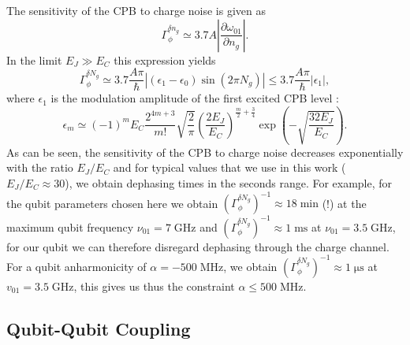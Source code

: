 The sensitivity of the CPB to charge noise is given as	
%
\begin{equation}
\Gamma_\phi^{\delta n_g} \simeq 3.7A \left|\frac{\partial \omega_{01}}{\partial n_g}\right|.
\end{equation}
%
In the limit $E_J\gg E_C$ this expression yields
%
\begin{equation}
\Gamma_\phi^{\delta N_g} \simeq 3.7\frac{A\pi}{\hbar}\left| (\epsilon_1-\epsilon_0)\sin{\left(2\pi N_g\right)}\right| \leq 3.7\frac{A\pi}{\hbar}|\epsilon_1|,
\end{equation}
%
where $\epsilon_1$ is the modulation amplitude of the first excited CPB level \citep{koch_charge-insensitive_2007}:
%
\begin{equation}
\epsilon_m\simeq (-1)^m E_C\frac{2^{4m+3}}{m!}\sqrt{\frac{2}{\pi}}\left(\frac{2E_J}{E_C}\right)^{\frac{m}{2}+\frac{3}{4}}\exp{\left(-\sqrt{\frac{32E_J}{E_C}}\right)}.
\end{equation}
%
As can be seen, the sensitivity of the CPB to charge noise decreases exponentially with the ratio $E_J/E_C$ and for typical values that we use in this work ($E_J/E_C\approx 30$), we obtain dephasing times in the seconds range. For example, for the qubit parameters chosen here we obtain $\left(\Gamma_{\phi}^{\delta N_g}\right)^{-1} \approx 18\;\mathrm{min}$ (!) at the maximum qubit frequency $\nu_{01}=7\;\mathrm{GHz}$ and  $\left(\Gamma_{\phi}^{\delta N_g}\right)^{-1} \approx 1\;\mathrm{ms}$ at $\nu_{01}=3.5\;\mathrm{GHz}$, for our qubit we can therefore disregard dephasing through the charge channel. For a qubit anharmonicity of $\alpha=-500\;\mathrm{MHz}$, we obtain $\left(\Gamma_{\phi}^{\delta N_g}\right)^{-1} \approx 1\;\mathrm{\mu s}$ at $v_{01}=3.5\;\mathrm{GHz}$, this gives us thus the constraint $\alpha\le 50	0 \;\mathrm{MHz}$. 

\subsection{Qubit-Qubit Coupling}

